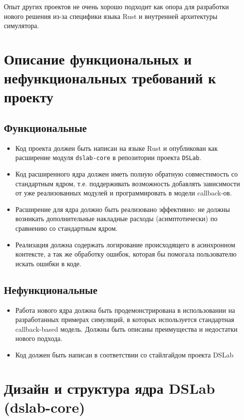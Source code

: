 Опыт других проектов не очень хорошо подходит как опора для разработки нового решения из-за специфики языка Rust и внутренней архитектуры симулятора.


\section{Описание функциональных и нефункциональных требований к проекту}\label{requirements}

\subsection{Функциональные}
\begin{itemize}
    \item Код проекта должен быть написан на языке Rust и опубликован как расширение модуля \texttt{dslab-core} в репозитории проекта \texttt{DSLab}\cite{dslab-repo}.
    \item Код расширенного ядра должен иметь полную обратную совместимость со стандартным ядром, т.е. поддерживать возможность добавлять зависимости от уже реализованных модулей и программировать в модели callback-ов.
    \item Расширение для ядра должно быть реализовано эффективно: не должны возникать дополнительные накладные расходы (асимптотически) по сравнению со стандартным ядром.
    \item Реализация должна содержать логирование происходящего в асинхронном контексте, а так же обработку ошибок, которая бы помогала пользователю искать ошибки в коде. 
\end{itemize}

\subsection{Нефункциональные}
\begin{itemize}
    \item Работа нового ядра должна быть продемонстрирована в использовании на разработанных примерах симуляций, в которых используется стандартная callback-based модель. Должны быть описаны преимущества и недостатки нового подхода.
    \item Код должен быть написан в соответствии со стайлгайдом проекта DSLab
\end{itemize}




\section{Дизайн и структура ядра DSLab (dslab-core)} \label{dslab-core-design}

